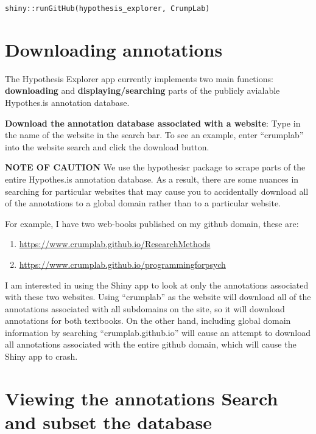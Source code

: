 \documentclass[]{book}
\providecommand{\tightlist}{%
  \setlength{\itemsep}{0pt}\setlength{\parskip}{0pt}}
\theoremstyle{definition}
\theoremstyle{definition}
\theoremstyle{definition}
\theoremstyle{remark}
\begin{document}
\texttt{shiny::runGitHub(\textquotesingle{}hypothesis\_explorer\textquotesingle{},\ \textquotesingle{}CrumpLab\textquotesingle{})}

\section{Downloading annotations}\label{downloading-annotations}

The Hypothesis Explorer app currently implements two main functions:
\textbf{downloading} and \textbf{displaying/searching} parts of the
publicly avialable Hypothes.is annotation database.

\textbf{Download the annotation database associated with a website}:
Type in the name of the website in the search bar. To see an example,
enter ``crumplab'' into the website search and click the download
button.

\textbf{NOTE OF CAUTION} We use the hypothesisr package to scrape parts
of the entire Hypothes.is annotation database. As a result, there are
some nuances in searching for particular websites that may cause you to
accidentally download all of the annotations to a global domain rather
than to a particular website.

For example, I have two web-books published on my github domain, these
are:

\begin{enumerate}
\def\labelenumi{\arabic{enumi}.}
\tightlist
\item
  \url{https://www.crumplab.github.io/ResearchMethods}
\item
  \url{https://www.crumplab.github.io/programmingforpsych}
\end{enumerate}

I am interested in using the Shiny app to look at only the annotations
associated with these two websites. Using ``crumplab'' as the website
will download all of the annotations associated with all subdomains on
the site, so it will download annotations for both textbooks. On the
other hand, including global domain information by searching
``crumplab.github.io'' will cause an attempt to download all annotations
associated with the entire github domain, which will cause the Shiny app
to crash.

\section{Viewing the annotations Search and subset the
database}\label{viewing-the-annotations-search-and-subset-the-database}
\end{document}
